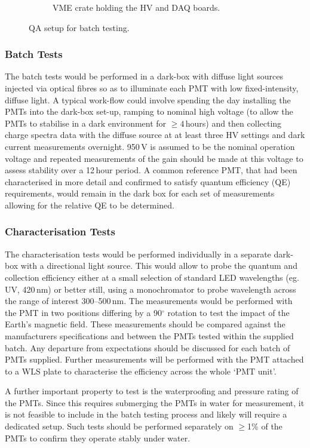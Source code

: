 \documentclass[12pt,a4paper]{article}
\begin{document}
\begin{figure}[!htb]
\begin{subfigure}{.49\textwidth}
  \caption{VME crate holding the HV and DAQ boards.}
  \label{fig:QA_elec}
\end{subfigure}
\caption{QA setup for batch testing.}
\label{fig:QA_setup}
\end{figure}

\subsubsection{Batch Tests}
The batch tests would be performed in a dark-box with diffuse light sources injected via optical fibres so as to illuminate each PMT with low fixed-intensity, diffuse light. A typical work-flow could involve spending the day installing the PMTs into the dark-box set-up, ramping to nominal high voltage (to allow the PMTs to stabilise in a dark environment for $\ge4$\,hours) and then collecting charge spectra data with the diffuse source at at least three HV settings and dark current measurements overnight. 950\,V is assumed to be the nominal operation voltage and repeated measurements of the gain should be made at this voltage to assess stability over a 12\,hour period. A common reference PMT, that had been characterised in more detail and confirmed to satisfy quantum efficiency (QE) requirements, would remain in the dark box for each set of measurements allowing for the relative QE to be determined. 

\subsubsection{Characterisation Tests}
The characterisation tests would be performed individually in a separate dark-box with a directional light source. This would allow to probe the quantum and collection efficiency either at a small selection of standard LED wavelengths (eg. UV, 420\,nm) or better still, using a monochromator to probe wavelength across the range of interest 300--500\,nm. The measurements would be performed with the PMT in two positions differing by a 90$^\circ$ rotation to test the impact of the Earth's magnetic field. These measurements should be compared against the manufacturers specifications and between the PMTs tested within the supplied batch. Any departure from expectations should be discussed for each batch of PMTs supplied. Further measurements will be performed with the PMT attached to a WLS plate to characterise the efficiency across the whole `PMT unit'. 

A further important property to test is the waterproofing and pressure rating of the PMTs. Since this requires submerging the PMTs in water for measurement, it is not feasible to include in the batch testing process and likely will require a dedicated setup. Such tests should be performed separately on $\ge$1\% of the PMTs to confirm they operate stably under water.
\end{document}
